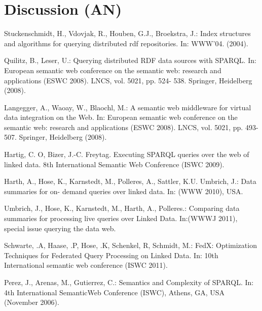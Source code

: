 \documentclass{sig-alternate}  %
\begin{document}
\section{Discussion (AN)}




%
%
\begin{thebibliography}{10}
Stuckenschmidt, H., Vdovjak, R., Houben, G.J., Broekstra,
J.: Index structures and algorithms for querying distributed rdf repositories.
In: WWW'04. (2004).

Quilitz, B., Leser, U.: Querying distributed RDF data
sources with SPARQL. In: European semantic web conference on the semantic
web: research and applications (ESWC 2008). LNCS, vol. 5021, pp. 524-
538. Springer, Heidelberg (2008).

Langegger, A., Waoay, W., Blaochl, M.: A semantic web
middleware for virtual data integration on the Web. In: European semantic
web conference on the semantic web: research and applications (ESWC
2008). LNCS, vol. 5021, pp. 493-507. Springer, Heidelberg (2008).

Hartig, C. O, Bizer, J.-C. Freytag. Executing SPARQL
queries over the web of linked data. 8th International Semantic Web
Conference (ISWC 2009).

Harth, A., Hose, K., Karnstedt, M., Polleres, A.,
Sattler, K.U. Umbrich, J.: Data summaries for on- demand queries over
linked data. In: (WWW 2010), USA.

Umbrich, J., Hose, K., Karnstedt, M., Harth, A., Polleres.:
Comparing data summaries for processing live queries over Linked Data.
In:(WWWJ 2011), special issue querying the data web. 

Schwarte, .A, Haase, .P, Hose, .K, Schenkel, R, Schmidt,
M.: FedX: Optimization Techniques for Federated Query Processing on
Linked Data. In: 10th International semantic web conference (ISWC
2011).

Perez, J., Arenas, M., Gutierrez, C.: Semantics and
Complexity of SPARQL. In: 4th International SemanticWeb Conference
(ISWC), Athens, GA, USA (November 2006).


\end{thebibliography}
\end{document}
